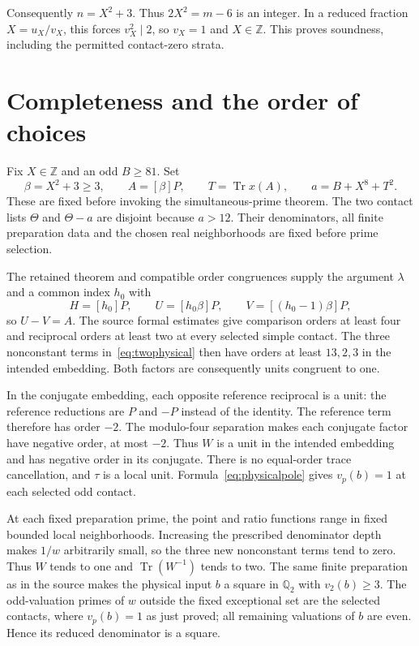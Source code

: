 \documentclass[11pt,a4paper]{article}
\theoremstyle{remark}\newtheorem{remark}[theorem]{Remark}
\newcommand{\Q}{\mathbb Q}\newcommand{\Z}{\mathbb Z}
\DeclareMathOperator{\Tr}{Tr}\DeclareMathOperator{\Nm}{N}
\begin{document}
Consequently $n=X^2+3$. Thus $2X^2=m-6$ is an integer. In a reduced
fraction $X=u_X/v_X$, this forces $v_X^2\mid2$, so $v_X=1$ and
$X\in\Z$. This proves soundness, including the permitted contact-zero
strata.

\section{Completeness and the order of choices}
Fix $X\in\Z$ and an odd $B\ge81$. Set
\[
 \beta=X^2+3\ge3,\qquad A=[\beta]P,\qquad
 T=\Tr x(A),\qquad a=B+X^8+T^2.
\]
These are fixed before invoking the simultaneous-prime theorem.
The two contact lists $\Theta$ and $\Theta-a$ are disjoint because
$a>12$. Their denominators, all finite preparation data and the chosen
real neighborhoods are fixed before prime selection.

The retained theorem and compatible order congruences supply the argument
$\lambda$ and a common index $h_0$ with
\[
 H=[h_0]P,\qquad U=[h_0\beta]P,\qquad
 V=[(h_0-1)\beta]P,
\]
so $U-V=A$. The source formal estimates give comparison orders at
least four and reciprocal orders at least two at every selected simple
contact. The three nonconstant terms in~\eqref{eq:twophysical}
then have orders at least $13,2,3$ in the intended embedding.
Both factors are consequently units congruent to one.

In the conjugate embedding, each opposite reference reciprocal is a
unit: the reference reductions are $P$ and $-P$ instead of the identity.
The reference term therefore has order $-2$. The modulo-four separation
makes each conjugate factor have negative order, at most $-2$.
Thus $W$ is a unit in the intended embedding and has negative order
in its conjugate. There is no equal-order trace cancellation, and
$\tau$ is a local unit. Formula~\eqref{eq:physicalpole} gives
$v_p(b)=1$ at each selected odd contact.

At each fixed preparation prime, the point and ratio functions range
in fixed bounded local neighborhoods. Increasing the prescribed
denominator depth makes $1/w$ arbitrarily small, so the three new
nonconstant terms tend to zero. Thus $W$ tends to one and
$\Tr(W^{-1})$ tends to two. The same finite preparation as in the
source makes the physical input $b$ a square in $\Q_2$ with
$v_2(b)\ge3$. The odd-valuation primes of $w$ outside the fixed
exceptional set are the selected contacts, where $v_p(b)=1$ as just
proved; all remaining valuations of $b$ are even. Hence its reduced
denominator is a square.
\end{document}
